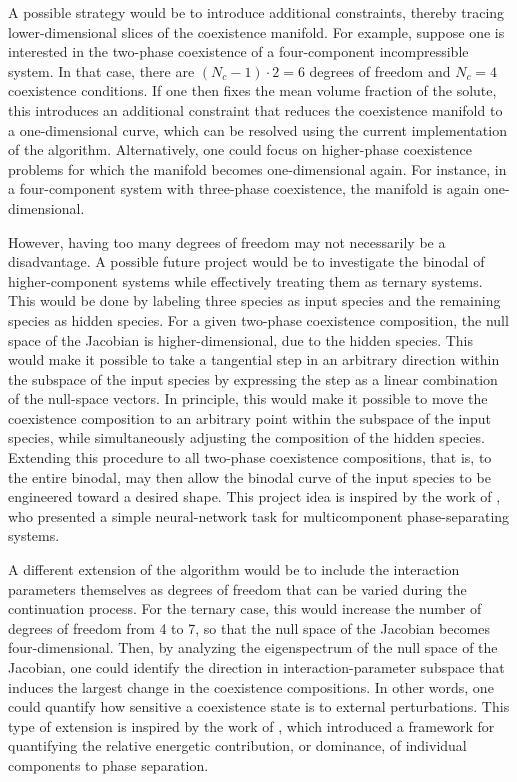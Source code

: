 \documentclass[12pt]{article}
\begin{document}
A possible strategy would be to introduce additional constraints, thereby tracing lower-dimensional slices of the coexistence manifold. For example, suppose one is interested in the two-phase coexistence of a four-component incompressible system. In that case, there are \((N_c-1)\cdot 2 = 6\) degrees of freedom and \(N_c = 4\) coexistence conditions. If one then fixes the mean volume fraction of the solute, this introduces an additional constraint that reduces the coexistence manifold to a one-dimensional curve, which can be resolved using the current implementation of the algorithm. Alternatively, one could focus on higher-phase coexistence problems for which the manifold becomes one-dimensional again. For instance, in a four-component system with three-phase coexistence, the manifold is again one-dimensional.

However, having too many degrees of freedom may not necessarily be a disadvantage. A possible future project would be to investigate the binodal of higher-component systems while effectively treating them as ternary systems.
This would be done by labeling three species as input species and the remaining species as hidden species. For a given two-phase coexistence composition, the null space of the Jacobian is higher-dimensional, due to the hidden species. This would make it possible to take a tangential step in an arbitrary direction within the subspace of the input species by expressing the step as a linear combination of the null-space vectors.
In principle, this would make it possible to move the coexistence composition to an arbitrary point within the subspace of the input species, while simultaneously adjusting the composition of the hidden species. Extending this procedure to all two-phase coexistence compositions, that is, to the entire binodal, may then allow the binodal curve of the input species to be engineered toward a desired shape. This project idea is inspired by the work of \cite{zentner2025informationprocessingdrivenmulticomponent}, who presented a simple neural-network task for multicomponent phase-separating systems.

A different extension of the algorithm would be to include the interaction parameters themselves as degrees of freedom that can be varied during the continuation process. For the ternary case, this would increase the number of degrees of freedom from 4 to 7, so that the null space of the Jacobian becomes four-dimensional. Then, by analyzing the eigenspectrum of the null space of the Jacobian, one could identify the direction in interaction-parameter subspace that induces the largest change in the coexistence compositions. In other words, one could quantify how sensitive a coexistence state is to external perturbations.
This type of extension is inspired by the work of \cite{Qian2024}, which introduced a framework for quantifying the relative energetic contribution, or dominance, of individual components to phase separation.
\clearpage
\end{document}
